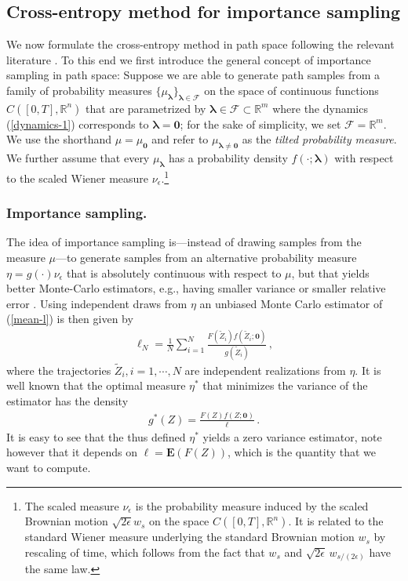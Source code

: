 \documentclass[final]{siamltex}
\newcommand{\cF}{{\mathcal F}}
\newcommand{\R}{{\mathbb R}}
\newcommand{\bE}{{\mathbf E}}
\newcommand{\eps}{\epsilon}
\newcommand{\blambda}{\bm{\lambda}}
\newcommand{\wrt}{with respect to }
\begin{document}
\subsection{Cross-entropy method for importance sampling}

We now formulate the cross-entropy method in path space following the relevant literature \cite{ce_tutorial,ce_book}. To this end we first introduce  the general concept of importance sampling in path space: Suppose we are able to generate path samples from a family of probability
measures $\{\mu_{\blambda}\}_{\blambda \in
\cF}$ on the space of continuous functions $C([0,T],\R^{n})$ that are
parametrized by $\blambda \in \cF\subset \mathbb{R}^m$ where the  dynamics
(\ref{dynamics-1}) corresponds to $\blambda = \bm{0}$; for the sake of
simplicity,  we set $\cF=\mathbb{R}^m$. We use the shorthand $\mu = \mu_{\bm{0}}$ and refer to $\mu_{\blambda\neq\bm{0}}$ as the \emph{tilted probability measure}. We further assume that every $\mu_{\blambda}$ has a probability density $f(\cdot;\blambda)$ \wrt the scaled Wiener measure $\nu_{\eps}$.\footnote{The scaled measure $\nu_{\eps}$ is the probability measure induced by the scaled Brownian motion $\sqrt{2\eps} w_{s}$ on the space $C([0,T],\R^{n})$. It is related to the standard Wiener measure underlying the standard Brownian motion $w_{s}$ by rescaling of time, which follows from the fact that $w_{s}$ and $\sqrt{2\eps}\,w_{s/(2\eps)}$ have the same law.}

\subsubsection*{Importance sampling.}
%
The idea of importance sampling is---instead of drawing samples from the measure $\mu$---to generate samples from an alternative probability measure $\eta = g(\cdot)\nu_{\eps}$ that is absolutely continuous \wrt $\mu$, but that yields better Monte-Carlo estimators, e.g., having smaller variance or smaller relative error \cite{Liu2008}. Using independent draws from $\eta$ an unbiased Monte Carlo estimator of (\ref{mean-l}) is then given by 
\begin{align}
  \ell_N = \frac{1}{N} \sum_{i=1}^{N}  \frac{F(\tilde{Z}_i)f(\tilde{Z}_i;\bm{0})}{g(\tilde{Z}_i)}\,,
\end{align}
where the trajectories $\tilde{Z}_i, i = 1, \cdots, N$ are independent realizations from $\eta$. It is well known that the optimal measure $\eta^*$ that minimizes the variance of the estimator has the density
\begin{align}
  g^*(Z) = \frac{F(Z)f(Z;\bm{0})}{\ell}\,.
  \label{optimal-pdf}
\end{align}
It is easy to see that the thus defined $\eta^{*}$ yields a zero variance estimator, note however that it depends on $\ell=\bE(F(Z))$, which is the quantity that we want to compute.
\end{document}
